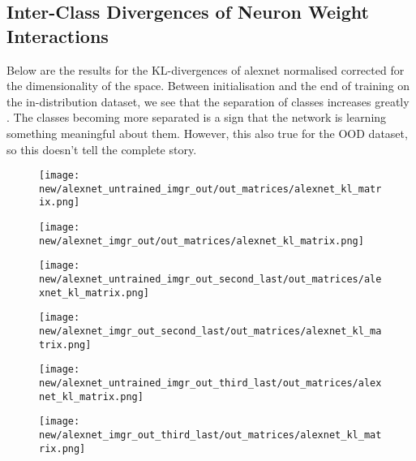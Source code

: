 \documentclass{article}
\begin{document}
        \subsection{Inter-Class Divergences of Neuron Weight Interactions}
            Below are the results for the KL-divergences of alexnet normalised corrected for the dimensionality of the space. Between initialisation and the end of training on the in-distribution dataset, we see that the separation of classes increases greatly . The classes becoming more separated is a sign that the network is learning something meaningful about them. However, this also true for the OOD dataset, so this doesn't tell the complete story. 
            \begin{figure}[H]
                \centering
                \begin{minipage}{0.45\textwidth}
                    \centering
                    \texttt{[image: new/alexnet\_untrained\_imgr\_out/out\_matrices/alexnet\_kl\_matrix.png]}
                    
                \end{minipage}\hfill
                \begin{minipage}{0.45\textwidth}
                    \centering
                    \texttt{[image: new/alexnet\_imgr\_out/out\_matrices/alexnet\_kl\_matrix.png]}
                \end{minipage}
                \begin{minipage}{0.45\textwidth}
                    \centering
                    \texttt{[image: new/alexnet\_untrained\_imgr\_out\_second\_last/out\_matrices/alexnet\_kl\_matrix.png]}
                    
                \end{minipage}\hfill
                \begin{minipage}{0.45\textwidth}
                    \centering
                    \texttt{[image: new/alexnet\_imgr\_out\_second\_last/out\_matrices/alexnet\_kl\_matrix.png]}
                \end{minipage}
                
                \begin{minipage}{0.45\textwidth}
                    \centering
                    \texttt{[image: new/alexnet\_untrained\_imgr\_out\_third\_last/out\_matrices/alexnet\_kl\_matrix.png]}
                    
                \end{minipage}\hfill
                \begin{minipage}{0.45\textwidth}
                    \centering
                    \texttt{[image: new/alexnet\_imgr\_out\_third\_last/out\_matrices/alexnet\_kl\_matrix.png]}
                \end{minipage}
                

\end{figure}
\end{document}
